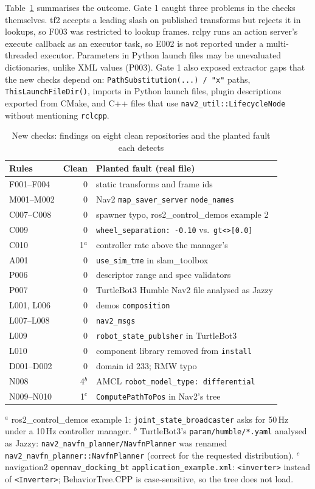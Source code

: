 \documentclass[conference]{IEEEtran}
\newcommand{\code}[1]{\texttt{#1}}
\begin{document}
Table~\ref{tab:protocol} summarises the outcome. Gate 1 caught three problems in the checks
themselves. tf2 accepts a leading slash on published transforms but rejects it in lookups, so F003
was restricted to lookup frames. rclpy runs an action server's execute callback as an executor
task, so E002 is not reported under a multi-threaded executor. Parameters in Python launch files
may be unevaluated dictionaries, unlike XML values (P003). Gate 1 also exposed extractor gaps that
the new checks depend on: \code{PathSubstitution(...) / "x"} paths, \code{ThisLaunchFileDir()},
imports in Python launch files, plugin descriptions exported from CMake, and C++ files that use
\code{nav2\_util::LifecycleNode} without mentioning \code{rclcpp}.

\begin{table}[t]
\centering
\caption{New checks: findings on eight clean repositories and the planted fault each detects}
\label{tab:protocol}
\footnotesize
\begin{tabular}{@{}l r p{4.2cm}@{}}
\toprule
Rules & Clean & Planted fault (real file) \\
\midrule
F001--F004 & 0 & static transforms and frame ids \\
M001--M002 & 0 & Nav2 \code{map\_saver\_server} \code{node\_names} \\
C007--C008 & 0 & spawner typo, ros2\_control\_demos example 2 \\
C009 & 0 & \code{wheel\_separation: -0.10} vs.\ \code{gt<>[0.0]} \\
C010 & 1$^a$ & controller rate above the manager's \\
A001 & 0 & \code{use\_sim\_tme} in slam\_toolbox \\
P006 & 0 & descriptor range and spec validators \\
P007 & 0 & TurtleBot3 Humble Nav2 file analysed as Jazzy \\
L001, L006 & 0 & demos \code{composition} \\
L007--L008 & 0 & \code{nav2\_msgs} \\
L009 & 0 & \code{robot\_state\_publsher} in TurtleBot3 \\
L010 & 0 & component library removed from \code{install} \\
D001--D002 & 0 & domain id 233; RMW typo \\
N008 & 4$^b$ & AMCL \code{robot\_model\_type: differential} \\
N009--N010 & 1$^c$ & \code{ComputePathToPos} in Nav2's tree \\
\bottomrule
\end{tabular}

\smallskip\raggedright\footnotesize
$^a$ ros2\_control\_demos example 1: \code{joint\_state\_broadcaster} asks for 50\,Hz under a
10\,Hz controller manager. $^b$ TurtleBot3's \code{param/humble/*.yaml} analysed as Jazzy:
\code{nav2\_navfn\_planner/NavfnPlanner} was renamed \code{nav2\_navfn\_planner::NavfnPlanner}
(correct for the requested distribution). $^c$ navigation2 \code{opennav\_docking\_bt}
\code{application\_example.xml}: \code{<inverter>} instead of \code{<Inverter>}; BehaviorTree.CPP
is case-sensitive, so the tree does not load.
\end{table}
\end{document}
